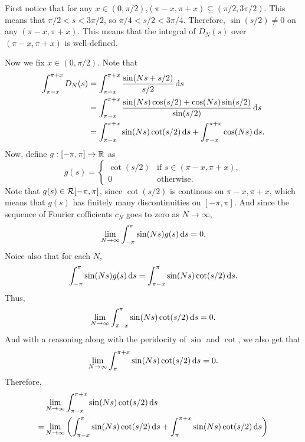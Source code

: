 \documentclass[12pt]{article}
\begin{document}
\begin{fproof}[4(a)]
 First notice that for any \(x \in (0, \pi/2)\),\((\pi - x, \pi + x) \subseteq (\pi/2, 3\pi/2)\).
 This means that \(\pi/2 < s < 3\pi/2 \), so \(\pi/4 < s/2 < 3\pi/4\).
 Therefore, \(\sin(s/2) \neq 0\) on any \((\pi - x, \pi + x)\).
 This means that the integral of \(D_N(s)\) over \((\pi - x, \pi + x)\) is well-defined.

 Now we fix \(x \in (0, \pi/2)\).
 Note that
 \begin{align*}
   \int_{\pi - x}^{\pi+x} D_N(s) 
   &= \int_{\pi - x}^{\pi+x} \frac{\sin(Ns + s/2)}{s/2} \mathop{}\!\mathrm{d} s\\
   &=\int_{\pi - x}^{\pi+x}\frac{\sin(Ns)\cos(s/2)+\cos(Ns)\sin(s/2)}{\sin(s/2)} \mathop{}\!\mathrm{d} s\\
   &=\int_{\pi - x}^{\pi+x} \sin(Ns) \cot(s/2) \mathop{}\!\mathrm{d} s + \int_{\pi - x}^{\pi+x} \cos(Ns) \mathop{}\!\mathrm{d} s.
 \end{align*}
 Now, define \(g: [-\pi, \pi] \to \mathbb {R}\) as
 \[
 g(s) = \begin{cases}
   \cot(s/2) & \text{if } s \in (\pi-x, \pi+x),\\
   0 & \text{otherwise}.
 \end{cases}
 \]
 Note that \(g(s)\in \mathcal{R}[-\pi, \pi]\), since \(\cot(s/2)\) is continous on \(\pi-x, \pi+x\), which means that \(g(s)\) has finitely many discontinuities on \([-\pi, \pi]\).
 And since the sequence of Fourier cofficients \(c_N\) goes to zero as \(N \to \infty\),
 \begin{align*}
   \lim_{N\to \infty} \int_{-\pi}^{\pi} \sin(Ns) g(s) \mathop{}\!\mathrm{d} s = 0.
 \end{align*}
 Noice also that for each \(N\),
 \begin{align*}
   \int_{-\pi}^{\pi} \sin(Ns) g(s) \mathop{}\!\mathrm{d} s = \int_{\pi-x}^{\pi} \sin(Ns) \cot(s/2) \mathop{}\!\mathrm{d} s.
 \end{align*}
 Thus, 
 \begin{align*}
   \lim_{N\to \infty} \int_{\pi-x}^{\pi} \sin(Ns) \cot(s/2) \mathop{}\!\mathrm{d} s = 0.
 \end{align*}
 And with a reasoning along with the peridocity of \(\sin\) and \(\cot\), we also get that
 \begin{align*}
   \lim_{N\to \infty} \int_{\pi}^{\pi+x} \sin(Ns) \cot(s/2) \mathop{}\!\mathrm{d} s = 0.
 \end{align*}
 Therefore, 
 \begin{align*}
   &\lim_{N \to \infty} \int_{\pi-x}^{\pi+x} \sin(Ns) \cot(s/2) \ds \\
   =& \lim_{N \to \infty} \pare{\int_{\pi-x}^{\pi} \sin(Ns) \cot(s/2) \ds + \int_{\pi}^{\pi+x} \sin(Ns) \cot(s/2) \ds}\\

\end{align*}
\end{fproof}
\end{document}
